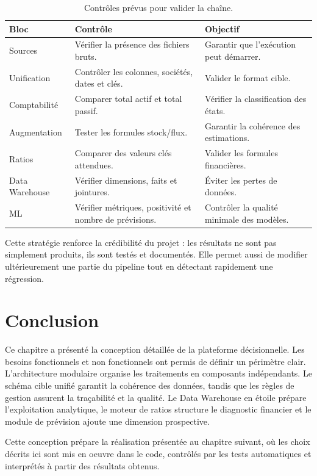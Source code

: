 \begin{table}[H]
\centering
\caption[Stratégie de validation]{Contrôles prévus pour valider la chaîne.}
\label{tab:validation}
\begin{tabularx}{\linewidth}{|p{3cm}|X|X|}
\hline
\textbf{Bloc} & \textbf{Contrôle} & \textbf{Objectif} \\ \hline
Sources & Vérifier la présence des fichiers bruts. & Garantir que l'exécution peut démarrer. \\ \hline
Unification & Contrôler les colonnes, sociétés, dates et clés. & Valider le format cible. \\ \hline
Comptabilité & Comparer total actif et total passif. & Vérifier la classification des états. \\ \hline
Augmentation & Tester les formules stock/flux. & Garantir la cohérence des estimations. \\ \hline
Ratios & Comparer des valeurs clés attendues. & Valider les formules financières. \\ \hline
Data Warehouse & Vérifier dimensions, faits et jointures. & Éviter les pertes de données. \\ \hline
ML & Vérifier métriques, positivité et nombre de prévisions. & Contrôler la qualité minimale des modèles. \\ \hline
\end{tabularx}
\end{table}

\par Cette stratégie renforce la crédibilité du projet : les résultats ne sont
pas simplement produits, ils sont testés et documentés. Elle permet aussi de
modifier ultérieurement une partie du pipeline tout en détectant rapidement une
régression.

\section*{Conclusion}
\par Ce chapitre a présenté la conception détaillée de la plateforme
décisionnelle. Les besoins fonctionnels et non fonctionnels ont permis de
définir un périmètre clair. L'architecture modulaire organise les traitements en
composants indépendants. Le schéma cible unifié garantit la cohérence des
données, tandis que les règles de gestion assurent la traçabilité et la qualité.
Le Data Warehouse en étoile prépare l'exploitation analytique, le moteur de
ratios structure le diagnostic financier et le module de prévision ajoute une
dimension prospective.

\par Cette conception prépare la réalisation présentée au chapitre suivant, où
les choix décrits ici sont mis en oeuvre dans le code, contrôlés par les tests
automatiques et interprétés à partir des résultats obtenus.
